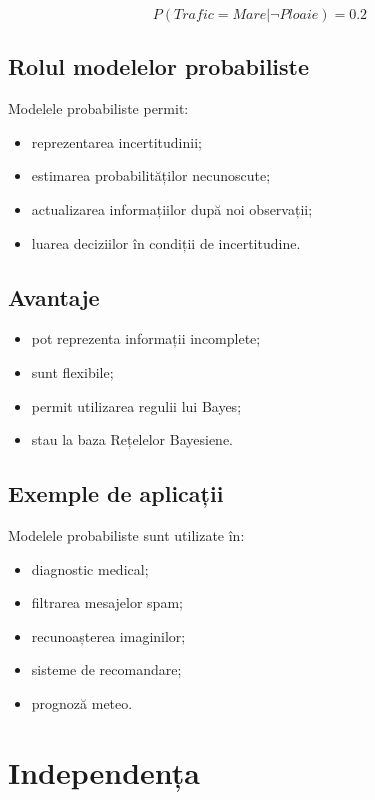 \documentclass[12pt,a4paper]{article}
\begin{document}
\[
P(Trafic=Mare|\neg Ploaie)=0.2
\]

\subsection{Rolul modelelor probabiliste}

Modelele probabiliste permit:

\begin{itemize}
\item reprezentarea incertitudinii;
\item estimarea probabilităților necunoscute;
\item actualizarea informațiilor după noi observații;
\item luarea deciziilor în condiții de incertitudine.
\end{itemize}

\subsection{Avantaje}

\begin{itemize}
\item pot reprezenta informații incomplete;
\item sunt flexibile;
\item permit utilizarea regulii lui Bayes;
\item stau la baza Rețelelor Bayesiene.
\end{itemize}

\subsection{Exemple de aplicații}

Modelele probabiliste sunt utilizate în:

\begin{itemize}
\item diagnostic medical;
\item filtrarea mesajelor spam;
\item recunoașterea imaginilor;
\item sisteme de recomandare;
\item prognoză meteo.
\end{itemize}






\section{Independența}
\end{document}
